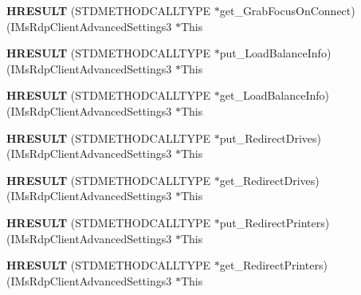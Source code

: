 \begin{DoxyCompactItemize}
{\bfseries H\+R\+E\+S\+U\+LT} (S\+T\+D\+M\+E\+T\+H\+O\+D\+C\+A\+L\+L\+T\+Y\+PE $\ast$get\+\_\+\+Grab\+Focus\+On\+Connect)(I\+Ms\+Rdp\+Client\+Advanced\+Settings3 $\ast$This
\item 
\mbox{\label{struct_i_ms_rdp_client_advanced_settings3_vtbl_a23c3a13eb7321c165bd9c2633c1b25a3}} 
{\bfseries H\+R\+E\+S\+U\+LT} (S\+T\+D\+M\+E\+T\+H\+O\+D\+C\+A\+L\+L\+T\+Y\+PE $\ast$put\+\_\+\+Load\+Balance\+Info)(I\+Ms\+Rdp\+Client\+Advanced\+Settings3 $\ast$This
\item 
\mbox{\label{struct_i_ms_rdp_client_advanced_settings3_vtbl_ad3108baa80c4e2de9ac4ae6e0bac787f}} 
{\bfseries H\+R\+E\+S\+U\+LT} (S\+T\+D\+M\+E\+T\+H\+O\+D\+C\+A\+L\+L\+T\+Y\+PE $\ast$get\+\_\+\+Load\+Balance\+Info)(I\+Ms\+Rdp\+Client\+Advanced\+Settings3 $\ast$This
\item 
\mbox{\label{struct_i_ms_rdp_client_advanced_settings3_vtbl_ad110739f6fad44afaf62b73d43e955b2}} 
{\bfseries H\+R\+E\+S\+U\+LT} (S\+T\+D\+M\+E\+T\+H\+O\+D\+C\+A\+L\+L\+T\+Y\+PE $\ast$put\+\_\+\+Redirect\+Drives)(I\+Ms\+Rdp\+Client\+Advanced\+Settings3 $\ast$This
\item 
\mbox{\label{struct_i_ms_rdp_client_advanced_settings3_vtbl_a264a7ee81d50464721eca34e61b09218}} 
{\bfseries H\+R\+E\+S\+U\+LT} (S\+T\+D\+M\+E\+T\+H\+O\+D\+C\+A\+L\+L\+T\+Y\+PE $\ast$get\+\_\+\+Redirect\+Drives)(I\+Ms\+Rdp\+Client\+Advanced\+Settings3 $\ast$This
\item 
\mbox{\label{struct_i_ms_rdp_client_advanced_settings3_vtbl_aa9906ac7320fff88d59ad11a3fa58445}} 
{\bfseries H\+R\+E\+S\+U\+LT} (S\+T\+D\+M\+E\+T\+H\+O\+D\+C\+A\+L\+L\+T\+Y\+PE $\ast$put\+\_\+\+Redirect\+Printers)(I\+Ms\+Rdp\+Client\+Advanced\+Settings3 $\ast$This
\item 
\mbox{\label{struct_i_ms_rdp_client_advanced_settings3_vtbl_a233ff60d57f4644e6297eae9e323f40d}} 
{\bfseries H\+R\+E\+S\+U\+LT} (S\+T\+D\+M\+E\+T\+H\+O\+D\+C\+A\+L\+L\+T\+Y\+PE $\ast$get\+\_\+\+Redirect\+Printers)(I\+Ms\+Rdp\+Client\+Advanced\+Settings3 $\ast$This

\end{DoxyCompactItemize}
